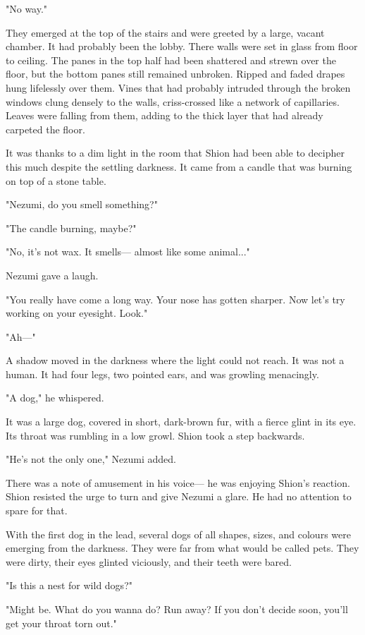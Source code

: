 "No way."

They emerged at the top of the stairs and were greeted by a large,
vacant chamber. It had probably been the lobby. There walls were set in
glass from floor to ceiling. The panes in the top half had been
shattered and strewn over the floor, but the bottom panes still remained
unbroken. Ripped and faded drapes hung lifelessly over them. Vines that
had probably intruded through the broken windows clung densely to the
walls, criss-crossed like a network of capillaries. Leaves were falling
from them, adding to the thick layer that had already carpeted the
floor.

It was thanks to a dim light in the room that Shion had been able to
decipher this much despite the settling darkness. It came from a candle
that was burning on top of a stone table.

"Nezumi, do you smell something?"

"The candle burning, maybe?"

"No, it's not wax. It smells--- almost like some animal..."

Nezumi gave a laugh.

"You really have come a long way. Your nose has gotten sharper. Now
let's try working on your eyesight. Look."

"Ah---"

A shadow moved in the darkness where the light could not reach. It was
not a human. It had four legs, two pointed ears, and was growling
menacingly.

"A dog," he whispered.

It was a large dog, covered in short, dark-brown fur, with a fierce
glint in its eye. Its throat was rumbling in a low growl. Shion took a
step backwards.

"He's not the only one," Nezumi added.

There was a note of amusement in his voice--- he was enjoying Shion's
reaction. Shion resisted the urge to turn and give Nezumi a glare. He
had no attention to spare for that.

With the first dog in the lead, several dogs of all shapes, sizes, and
colours were emerging from the darkness. They were far from what would
be called pets. They were dirty, their eyes glinted viciously, and their
teeth were bared.

"Is this a nest for wild dogs?"

"Might be. What do you wanna do? Run away? If you don't decide soon,
you'll get your throat torn out."

